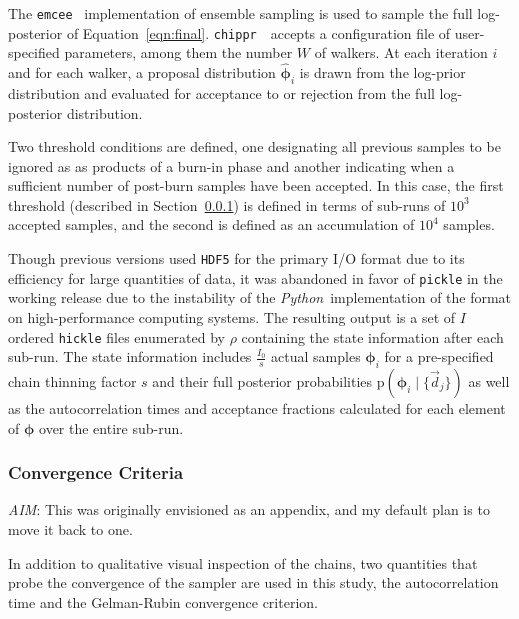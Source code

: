 \documentclass[iop]{emulateapj}
\newcommand{\todo}[3]{{\color{#2}\emph{#1}: #3}}
\newcommand{\aim}[1]{\todo{AIM}{red}{#1}}
\newcommand{\Sect}[1]{Section~\ref{#1}}
\newcommand{\Eq}[1]{Equation~\ref{#1}}
\newcommand{\Fig}[1]{Figure~\ref{#1}}
\newcommand{\repo}[1]{{\texttt{#1}}~}
\newcommand{\chippr}{\repo{chippr}}
\newcommand{\emcee}{\repo{emcee}}
\newcommand{\python}{\textit{Python}}
\newcommand{\data}{\ensuremath{\vec{d}}}
\newcommand{\pr}[1]{\ensuremath{\mathrm{p}(#1)}}
\newcommand{\gvn}{\mid}%
\newcommand{\bvec}[1]{\ensuremath{\boldsymbol{#1}}}
\newcommand{\ndphi}{\bvec{\phi}}
\begin{document}
The \emcee \citep{foreman-mackey_emcee_2013} implementation of ensemble sampling is used to sample the full log-posterior of \Eq{eqn:final}. 
\chippr\ accepts a configuration file of user-specified parameters, among them the number $W$ of walkers.
At each iteration $i$ and for each walker, a proposal distribution $\hat{\ndphi}_{i}$ is drawn from the log-prior distribution and evaluated for acceptance to or rejection from the full log-posterior distribution.

Two threshold conditions are defined, one designating all previous samples to be ignored as as products of a burn-in phase and another indicating when a sufficient number of post-burn samples have been accepted.  
In this case, the first threshold (described in \Sect{sec:acorr}) is defined in terms of sub-runs of $10^{3}$ accepted samples, and the second is defined as an accumulation of $10^{4}$ samples.

Though previous versions used \texttt{HDF5} for the primary I/O format due to its efficiency for large quantities of data, it was abandoned in favor of \texttt{pickle} in the working release due to the instability of the \python\ implementation of the format on high-performance computing systems.  
The resulting output is a set of $I$ ordered \texttt{hickle} files enumerated by $\rho$ containing the state information after each sub-run.  
The state information includes $\frac{I_{0}}{s}$ actual samples $\ndphi_{i}$ for a pre-specified chain thinning factor $s$ and their full posterior probabilities $\pr{\ndphi_{i} \gvn \{\data_{j}\}}$ as well as the autocorrelation times and acceptance fractions calculated for each element of $\ndphi$ over the entire sub-run.  

\subsubsection{Convergence Criteria}
\label{sec:acorr}

\aim{This was originally envisioned as an appendix, and my default plan is to move it back to one.}

In addition to qualitative visual inspection of the chains, two quantities that probe the convergence of the sampler are used in this study, the autocorrelation time and the Gelman-Rubin convergence criterion.  

\end{document}
